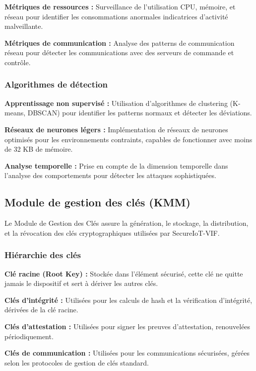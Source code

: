 \textbf{Métriques de ressources :} Surveillance de l'utilisation CPU, mémoire, et réseau pour identifier les consommations anormales indicatrices d'activité malveillante.

\textbf{Métriques de communication :} Analyse des patterns de communication réseau pour détecter les communications avec des serveurs de commande et contrôle.

\subsubsection{Algorithmes de détection}

\textbf{Apprentissage non supervisé :} Utilisation d'algorithmes de clustering (K-means, DBSCAN) pour identifier les patterns normaux et détecter les déviations.

\textbf{Réseaux de neurones légers :} Implémentation de réseaux de neurones optimisés pour les environnements contraints, capables de fonctionner avec moins de 32 KB de mémoire.

\textbf{Analyse temporelle :} Prise en compte de la dimension temporelle dans l'analyse des comportements pour détecter les attaques sophistiquées.

\subsection{Module de gestion des clés (KMM)}

Le Module de Gestion des Clés assure la génération, le stockage, la distribution, et la révocation des clés cryptographiques utilisées par SecureIoT-VIF.

\subsubsection{Hiérarchie des clés}

\textbf{Clé racine (Root Key) :} Stockée dans l'élément sécurisé, cette clé ne quitte jamais le dispositif et sert à dériver les autres clés.

\textbf{Clés d'intégrité :} Utilisées pour les calculs de hash et la vérification d'intégrité, dérivées de la clé racine.

\textbf{Clés d'attestation :} Utilisées pour signer les preuves d'attestation, renouvelées périodiquement.

\textbf{Clés de communication :} Utilisées pour les communications sécurisées, gérées selon les protocoles de gestion de clés standard.

